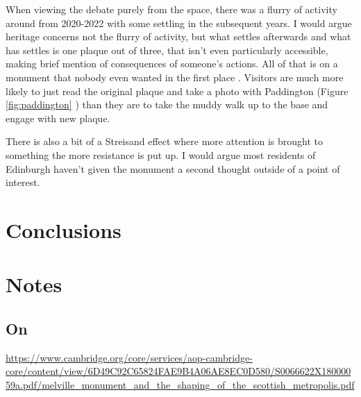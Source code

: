 \documentclass{scrartcl}
\begin{document}
When viewing the debate purely from the space, there was a flurry of activity around from 2020-2022 with some settling in the subsequent years. I would argue heritage concerns not the flurry of activity, but what settles afterwards and what has settles is one plaque out of three, that isn't even particularly accessible, making brief mention of consequences of someone's actions. All of that is on a monument that nobody even wanted in the first place \cite{godard_2018}.  Visitors are much more likely to just read the original plaque and take a photo with Paddington (Figure \ref{fig:paddington} ) than they are to take the muddy walk up to the base and engage with new plaque.

There is also a bit of a Streisand effect where more attention is brought to something the more resistance is put up. I would argue most residents of Edinburgh haven't given the monument a second thought outside of a point of interest.

\section{Conclusions}

\section{Notes}

\subsection{On \cite{godard_2018}}

\url{https://www.cambridge.org/core/services/aop-cambridge-core/content/view/6D49C92C65824FAE9B4A06AE8EC0D580/S0066622X18000059a.pdf/melville_monument_and_the_shaping_of_the_scottish_metropolis.pdf}
\end{document}
